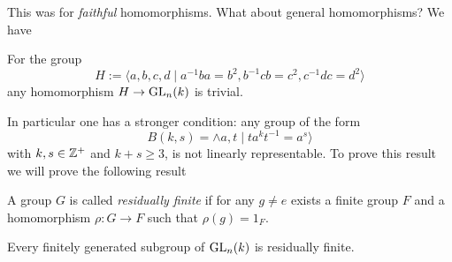 \documentclass[11pt]{scrartcl}
\begin{document}
	This was for \textit{faithful} homomorphisms. What about general homomorphisms? We have
	\begin{theorem}
		For the group
		$$H:=\langle a,b,c,d\mid a^{-1}ba=b^2,b^{-1}cb=c^2,c^{-1}dc=d^2\rangle$$
		any homomorphism $H\to \operatorname{GL}_n(k)$ is trivial. 
	\end{theorem}
	In particular one has a stronger condition: any group of the form
	$$B(k,s)=\land a,t\mid ta^kt^{-1}=a^s\rangle $$
	with $k,s\in\mathbb Z^+$ and $k+s\ge 3$, is not linearly representable. To prove this result we will prove the following result
	\begin{definition}
		A group $G$ is called \textit{residually finite} if for any $g\ne e$ exists a finite group $F$ and a homomorphism $\rho:G\to F$ such that $\rho(g)=1_F$.
	\end{definition}
	\begin{theorem}
		Every finitely generated subgroup of $\operatorname{GL}_n(k)$ is residually finite.
	\end{theorem}
	
	
\end{document}
